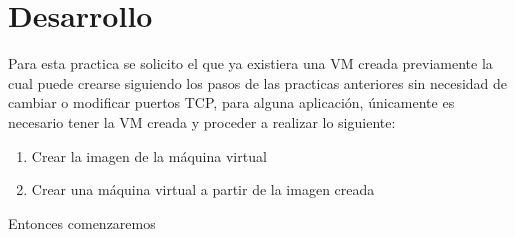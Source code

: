 \documentclass[10pt,executivepaper]{article}
\begin{document}
\begin{center}
	\par{}
\par{}
\par{}
\par\vspace{2cm}{
	Ultima fecha modificado: \today
}
\end{center}

\clearpage
\section{Desarrollo}
Para esta practica se solicito el que ya existiera una VM creada previamente la cual puede crearse siguiendo los pasos de las practicas anteriores sin necesidad de cambiar o modificar puertos TCP, para alguna aplicación, únicamente es necesario tener la VM creada y proceder a realizar lo siguiente:
\begin{enumerate}
  \item Crear la imagen de la máquina virtual
  \item Crear una máquina virtual a partir de la imagen creada
\end{enumerate}
Entonces comenzaremos
\end{document}
